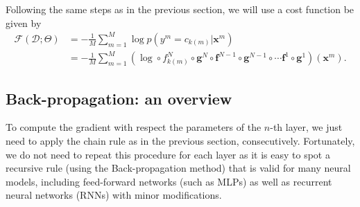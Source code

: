 
Following the same steps as in the previous section, we will use a cost function be given by %
\begin{align}
\mathcal{F}(\mathcal{D};\Theta) & = -\frac{1}{M}\sum_{m=1}^{M} \log p(y^m=c_{k(m)} | \mathbf{x}^m)\nonumber\\ & = -\frac{1}{M}\sum_{m=1}^{M} (\log \circ f_{k(m)}^N \circ \mathbf{g}^N \circ \mathbf{f}^{N-1} \circ \mathbf{g}^{N-1} \circ \cdots \mathbf{f}^1 \circ \mathbf{g}^1)(\mathbf{x}^m).
\end{align}

\subsection{Back-propagation: an overview}
To compute the gradient with respect the parameters of the $n$-th layer, we just need to apply the chain rule as in the previous section, consecutively. 
Fortunately, we
do not need to repeat this procedure for each layer as it is easy to spot a recursive
rule (using the Back-propagation method) that is valid for many neural models, including feed-forward networks (such as MLPs) as well as recurrent neural networks (RNNs) with minor modifications.  

